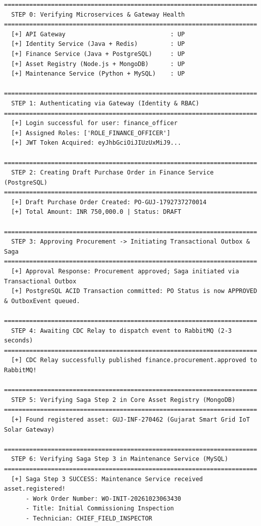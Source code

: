 \documentclass[11pt,a4paper]{article}
\begin{document}
\begin{lstlisting}[caption=Live Test Execution Log from test\_saga\_flow.py]
======================================================================
  STEP 0: Verifying Microservices & Gateway Health
======================================================================
  [+] API Gateway                             : UP
  [+] Identity Service (Java + Redis)         : UP
  [+] Finance Service (Java + PostgreSQL)     : UP
  [+] Asset Registry (Node.js + MongoDB)      : UP
  [+] Maintenance Service (Python + MySQL)    : UP

======================================================================
  STEP 1: Authenticating via Gateway (Identity & RBAC)
======================================================================
  [+] Login successful for user: finance_officer
  [+] Assigned Roles: ['ROLE_FINANCE_OFFICER']
  [+] JWT Token Acquired: eyJhbGciOiJIUzUxMiJ9...

======================================================================
  STEP 2: Creating Draft Purchase Order in Finance Service (PostgreSQL)
======================================================================
  [+] Draft Purchase Order Created: PO-GUJ-1792737270014
  [+] Total Amount: INR 750,000.0 | Status: DRAFT

======================================================================
  STEP 3: Approving Procurement -> Initiating Transactional Outbox & Saga
======================================================================
  [+] Approval Response: Procurement approved; Saga initiated via Transactional Outbox
  [+] PostgreSQL ACID Transaction committed: PO Status is now APPROVED & OutboxEvent queued.

======================================================================
  STEP 4: Awaiting CDC Relay to dispatch event to RabbitMQ (2-3 seconds)
======================================================================
  [+] CDC Relay successfully published finance.procurement.approved to RabbitMQ!

======================================================================
  STEP 5: Verifying Saga Step 2 in Core Asset Registry (MongoDB)
======================================================================
  [+] Found registered asset: GUJ-INF-270462 (Gujarat Smart Grid IoT Solar Gateway)

======================================================================
  STEP 6: Verifying Saga Step 3 in Maintenance Service (MySQL)
======================================================================
  [+] Saga Step 3 SUCCESS: Maintenance Service received asset.registered!
      - Work Order Number: WO-INIT-20261023063430
      - Title: Initial Commissioning Inspection
      - Technician: CHIEF_FIELD_INSPECTOR


\end{lstlisting}
\end{document}
